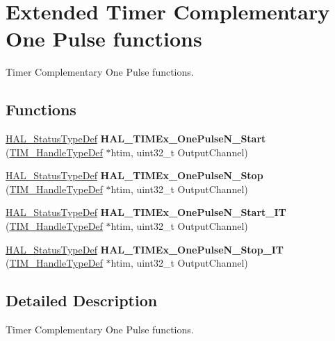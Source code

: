 \hypertarget{group___t_i_m_ex___exported___functions___group4}{}\section{Extended Timer Complementary One Pulse functions}
\label{group___t_i_m_ex___exported___functions___group4}


Timer Complementary One Pulse functions.  


\subsection*{Functions}
\begin{DoxyCompactItemize}
\item 
\mbox{\label{group___t_i_m_ex___exported___functions___group4_ga41e254708b0215a68acb6e0836d4f8ca}} 
\hyperlink{stm32f4xx__hal__def_8h_a63c0679d1cb8b8c684fbb0632743478f}{H\+A\+L\+\_\+\+Status\+Type\+Def} {\bfseries H\+A\+L\+\_\+\+T\+I\+M\+Ex\+\_\+\+One\+Pulse\+N\+\_\+\+Start} (\hyperlink{struct_t_i_m___handle_type_def}{T\+I\+M\+\_\+\+Handle\+Type\+Def} $\ast$htim, uint32\+\_\+t Output\+Channel)
\item 
\mbox{\label{group___t_i_m_ex___exported___functions___group4_gaf42ab805f75ecece735d600e54cabf83}} 
\hyperlink{stm32f4xx__hal__def_8h_a63c0679d1cb8b8c684fbb0632743478f}{H\+A\+L\+\_\+\+Status\+Type\+Def} {\bfseries H\+A\+L\+\_\+\+T\+I\+M\+Ex\+\_\+\+One\+Pulse\+N\+\_\+\+Stop} (\hyperlink{struct_t_i_m___handle_type_def}{T\+I\+M\+\_\+\+Handle\+Type\+Def} $\ast$htim, uint32\+\_\+t Output\+Channel)
\item 
\mbox{\label{group___t_i_m_ex___exported___functions___group4_ga297a97004076cee5734510a0dece7665}} 
\hyperlink{stm32f4xx__hal__def_8h_a63c0679d1cb8b8c684fbb0632743478f}{H\+A\+L\+\_\+\+Status\+Type\+Def} {\bfseries H\+A\+L\+\_\+\+T\+I\+M\+Ex\+\_\+\+One\+Pulse\+N\+\_\+\+Start\+\_\+\+IT} (\hyperlink{struct_t_i_m___handle_type_def}{T\+I\+M\+\_\+\+Handle\+Type\+Def} $\ast$htim, uint32\+\_\+t Output\+Channel)
\item 
\mbox{\label{group___t_i_m_ex___exported___functions___group4_ga5b6f320c18f453054a5409db6b98254e}} 
\hyperlink{stm32f4xx__hal__def_8h_a63c0679d1cb8b8c684fbb0632743478f}{H\+A\+L\+\_\+\+Status\+Type\+Def} {\bfseries H\+A\+L\+\_\+\+T\+I\+M\+Ex\+\_\+\+One\+Pulse\+N\+\_\+\+Stop\+\_\+\+IT} (\hyperlink{struct_t_i_m___handle_type_def}{T\+I\+M\+\_\+\+Handle\+Type\+Def} $\ast$htim, uint32\+\_\+t Output\+Channel)
\end{DoxyCompactItemize}


\subsection{Detailed Description}
Timer Complementary One Pulse functions. 

